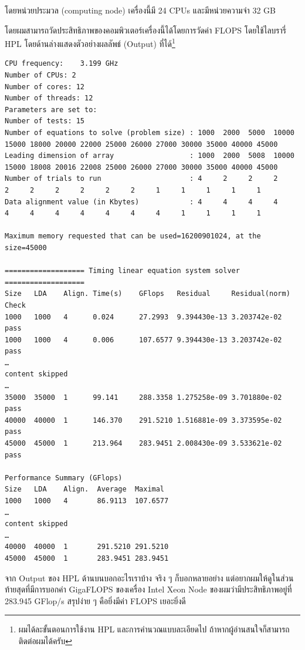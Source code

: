 \vspace{5pt}

\noindent โดยหน่วยประมวล (computing node) เครื่องนี้มี 24 CPUs และมีหน่วยความจำ 32 GB

โดยผมสามารถวัดประสิทธิภาพของคอมพิวเตอร์เครื่องนี้ได้โดยการวัดค่า FLOPS โดยใช้ไลบรารี่ HPL โดยด้านล่างแสดงตัวอย่างผลลัพธ์ (Output)
ที่ได้\footnote{ผมได้ละขั้นตอนการใช้งาน HPL และการคำนวณแบบละเอียดไป ถ้าหากผู้อ่านสนใจก็สามารถติดต่อผมได้ครับ}

\vspace{5pt}

\begin{lstlisting}[basicstyle=\ttfamily\footnotesize\linespread{0.5}]
CPU frequency:    3.199 GHz
Number of CPUs: 2
Number of cores: 12
Number of threads: 12
Parameters are set to:
Number of tests: 15
Number of equations to solve (problem size) : 1000  2000  5000  10000 15000 18000 20000 22000 25000 26000 27000 30000 35000 40000 45000
Leading dimension of array                  : 1000  2000  5008  10000 15000 18008 20016 22008 25000 26000 27000 30000 35000 40000 45000
Number of trials to run                     : 4     2     2     2     2     2     2     2     2     2     1     1     1     1     1
Data alignment value (in Kbytes)            : 4     4     4     4     4     4     4     4     4     4     4     1     1     1     1

Maximum memory requested that can be used=16200901024, at the size=45000

=================== Timing linear equation system solver ===================
Size   LDA    Align. Time(s)    GFlops   Residual     Residual(norm) Check
1000   1000   4      0.024      27.2993  9.394430e-13 3.203742e-02   pass
1000   1000   4      0.006      107.6577 9.394430e-13 3.203742e-02   pass
…
content skipped
…
35000  35000  1      99.141     288.3358 1.275258e-09 3.701880e-02   pass
40000  40000  1      146.370    291.5210 1.516881e-09 3.373595e-02   pass
45000  45000  1      213.964    283.9451 2.008430e-09 3.533621e-02   pass

Performance Summary (GFlops)
Size   LDA    Align.  Average  Maximal
1000   1000   4       86.9113  107.6577
…
content skipped
…
40000  40000  1       291.5210 291.5210
45000  45000  1       283.9451 283.9451
\end{lstlisting}

\vspace{5pt}

จาก Output ของ HPL ด้านบนบอกอะไรเราบ้าง จริง ๆ ก็บอกหลายอย่าง แต่อยากผมให้ดูในส่วนท้ายสุดที่มีการบอกค่า GigaFLOPS ของเครื่อง
Intel Xeon Node ของผมว่ามีประสิทธิภาพอยู่ที่ 283.945 GFlop/s สรุปง่าย ๆ คือยิ่งมีค่า FLOPS เยอะยิ่งดี

